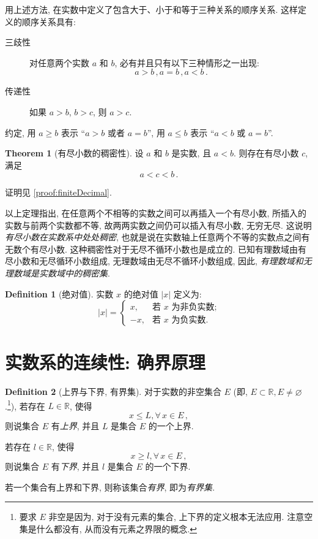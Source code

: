 \documentclass{book}
\renewcommand{\emptyset}{\varnothing}
\newcommand{\Any}{\forall\,}
\newcommand{\abs}[1]{\left\lvert #1 \right\rvert}
\numberwithin{equation}{section}
\numberwithin{figure}{section}
\theoremstyle{definition}
\newtheorem{definition}{Definition}
\newtheorem{theorem}{Theorem}[section]
\newcommand{\dq}[1]{``#1''}
\begin{document}
用上述方法, 在实数中定义了包含大于、小于和等于三种关系的顺序关系. 这样定义的顺序关系具有:
\begin{description}
  \item[三歧性] 对任意两个实数 $a$ 和 $b$, 必有并且只有以下三种情形之一出现:
    \begin{equation*}
      a>b\,,a=b\,,a<b\,.
    \end{equation*}
  \item[传递性] 如果 $a>b$, $b>c$, 则 $a>c$.
\end{description}

约定, 用 $a\geqslant b$ 表示 \dq{$a>b$ 或者 $a=b$}, 用 $a\leqslant b$ 表示 \dq{$a<b$ 或 $a=b$}.

\begin{theorem}[有尽小数的稠密性]
  设 $a$ 和 $b$ 是实数, 且 $a<b$. 则存在有尽小数 $c$, 满足
  \begin{equation*}
    a<c<b\,.
  \end{equation*}
\end{theorem}

证明见 \cref{proof:finiteDecimal}.

以上定理指出, 在任意两个不相等的实数之间可以再插入一个有尽小数, 所插入的实数与前两个实数都不等, 故两两实数之间仍可以插入有尽小数, 无穷无尽. 这说明\emph{有尽小数在实数系中处处稠密}, 也就是说在实数轴上任意两个不等的实数点之间有无数个有尽小数. 这种稠密性对于无尽不循环小数也是成立的. 已知有理数域由有尽小数和无尽循环小数组成, 无理数域由无尽不循环小数组成, 因此, \emph{有理数域和无理数域是实数域中的稠密集}.

\begin{definition}[绝对值]
  实数 $x$ 的绝对值 $\abs{x}$ 定义为:
  \begin{equation*}
    \abs{x}=
    \begin{cases}
      x,&\text{若 $x$ 为非负实数;}\\
      -x,&\text{若 $x$ 为负实数.}
    \end{cases}
  \end{equation*}
\end{definition}

\section{实数系的连续性: 确界原理}
\begin{definition}[上界与下界, 有界集]
  对于实数的非空集合 $E$ (即, $E\subset \mathbb{R}, E\neq \emptyset$.\footnote{要求 $E$ 非空是因为, 对于没有元素的集合, 上下界的定义根本无法应用. 注意空集是什么都没有, 从而没有元素之界限的概念.}), 若存在 $L\in \mathbb{R}$, 使得
  \begin{equation*}
    x\leqslant L, \Any x\in E\,,
  \end{equation*}
  则说集合 $E$ 有\emph{上界}, 并且 $L$ 是集合 $E$ 的一个上界.

  若存在 $l\in \mathbb{R}$, 使得
  \begin{equation*}
    x\geqslant l, \Any x\in E\,,
  \end{equation*}
  则说集合 $E$ 有\emph{下界}, 并且 $l$ 是集合 $E$ 的一个下界.

  若一个集合有上界和下界, 则称该集合\emph{有界}, 即为\emph{有界集}.
\end{definition}
\end{document}
